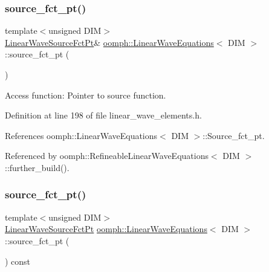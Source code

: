 \subsubsection{\texorpdfstring{source\+\_\+fct\+\_\+pt()}{source\_fct\_pt()}\hspace{0.1cm}{\footnotesize\ttfamily [1/2]}}
{\footnotesize\ttfamily template$<$unsigned D\+IM$>$ \\
\hyperlink{classoomph_1_1LinearWaveEquations_a9648dd63c18bab6854d362d16f01e33d}{Linear\+Wave\+Source\+Fct\+Pt}\& \hyperlink{classoomph_1_1LinearWaveEquations}{oomph\+::\+Linear\+Wave\+Equations}$<$ D\+IM $>$\+::source\+\_\+fct\+\_\+pt (\begin{DoxyParamCaption}{ }\end{DoxyParamCaption})\hspace{0.3cm}{\ttfamily [inline]}}



Access function\+: Pointer to source function. 



Definition at line 198 of file linear\+\_\+wave\+\_\+elements.\+h.



References oomph\+::\+Linear\+Wave\+Equations$<$ D\+I\+M $>$\+::\+Source\+\_\+fct\+\_\+pt.



Referenced by oomph\+::\+Refineable\+Linear\+Wave\+Equations$<$ D\+I\+M $>$\+::further\+\_\+build().

\mbox{\label{classoomph_1_1LinearWaveEquations_a61de270efb6fb0149da99d221580d13f}} 
\subsubsection{\texorpdfstring{source\+\_\+fct\+\_\+pt()}{source\_fct\_pt()}\hspace{0.1cm}{\footnotesize\ttfamily [2/2]}}
{\footnotesize\ttfamily template$<$unsigned D\+IM$>$ \\
\hyperlink{classoomph_1_1LinearWaveEquations_a9648dd63c18bab6854d362d16f01e33d}{Linear\+Wave\+Source\+Fct\+Pt} \hyperlink{classoomph_1_1LinearWaveEquations}{oomph\+::\+Linear\+Wave\+Equations}$<$ D\+IM $>$\+::source\+\_\+fct\+\_\+pt (\begin{DoxyParamCaption}{ }\end{DoxyParamCaption}) const\hspace{0.3cm}{\ttfamily [inline]}}




